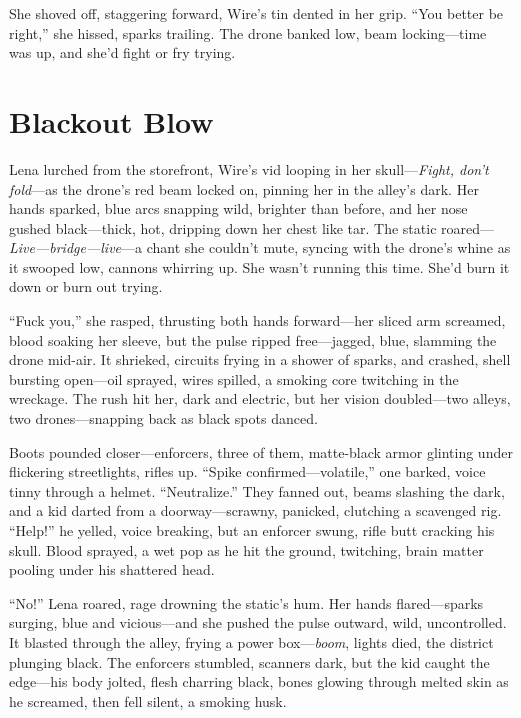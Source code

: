 \documentclass[12pt]{book}
\begin{document}
She shoved off, staggering forward, Wire’s tin dented in her grip. ``You better be right,'' she hissed, sparks trailing. The drone banked low, beam locking---time was up, and she’d fight or fry trying.

\section{Blackout Blow}

Lena lurched from the storefront, Wire’s vid looping in her skull---\textit{Fight, don’t fold}---as the drone’s red beam locked on, pinning her in the alley’s dark. Her hands sparked, blue arcs snapping wild, brighter than before, and her nose gushed black---thick, hot, dripping down her chest like tar. The static roared---\textit{Live---bridge---live}---a chant she couldn’t mute, syncing with the drone’s whine as it swooped low, cannons whirring up. She wasn’t running this time. She’d burn it down or burn out trying.

``Fuck you,'' she rasped, thrusting both hands forward---her sliced arm screamed, blood soaking her sleeve, but the pulse ripped free---jagged, blue, slamming the drone mid-air. It shrieked, circuits frying in a shower of sparks, and crashed, shell bursting open---oil sprayed, wires spilled, a smoking core twitching in the wreckage. The rush hit her, dark and electric, but her vision doubled---two alleys, two drones---snapping back as black spots danced.

Boots pounded closer---enforcers, three of them, matte-black armor glinting under flickering streetlights, rifles up. ``Spike confirmed---volatile,'' one barked, voice tinny through a helmet. ``Neutralize.'' They fanned out, beams slashing the dark, and a kid darted from a doorway---scrawny, panicked, clutching a scavenged rig. ``Help!'' he yelled, voice breaking, but an enforcer swung, rifle butt cracking his skull. Blood sprayed, a wet pop as he hit the ground, twitching, brain matter pooling under his shattered head.

``No!'' Lena roared, rage drowning the static’s hum. Her hands flared---sparks surging, blue and vicious---and she pushed the pulse outward, wild, uncontrolled. It blasted through the alley, frying a power box---\textit{boom}, lights died, the district plunging black. The enforcers stumbled, scanners dark, but the kid caught the edge---his body jolted, flesh charring black, bones glowing through melted skin as he screamed, then fell silent, a smoking husk.
\end{document}
